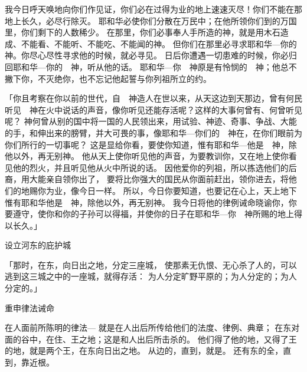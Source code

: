 {我今日呼天唤地向你们作见证，你们必在过{}得为业的地上速速灭尽！你们不能在那地上长久，必尽行除灭。
耶和华必使你们分散在万民中；在他所领你们到的万国里，你们剩下的人数稀少。
在那里，你们必事奉人手所造的神，就是用木石造成、不能看、不能听、不能吃、不能闻的神。
但你们在那里必寻求耶和华—你的　神。你尽心尽性寻求他的时候，就必寻见。
日后你遭遇一切患难的时候，你必归回耶和华—你的　神，听从他的话。
耶和华—你　神原是有怜悯的　神；他总不撇下你，不灭绝你，也不忘记他起誓与你列祖所立的约。
\par }{\PP {}「你且考察在你以前的世代，自　神造人在世以来，从天这边到天那边，曾有何民听见　神在火中说话的声音，像你听见还能存活呢？这样的大事何曾有、何曾听见呢？
神何曾从别的国中将一国的人民领出来，用试验、神迹、奇事、争战、大能的手，和伸出来的膀臂，并大可畏的事，像耶和华—你们的　神在{}，在你们眼前为你们所行的一切事呢？
这是显给你看，要使你知道，惟有耶和华—他是　神，除他以外，再无别神。
他从天上使你听见他的声音，为要教训你，又在地上使你看见他的烈火，并且听见他从火中所说的话。
因他爱你的列祖，所以拣选他们的后裔，用大能亲自领你出了{}，
要将比你强大的国民从你面前赶出，领你进去，将他们的地赐你为业，像今日一样。
所以，今日你要知道，也要记在心上，天上地下惟有耶和华他是　神，除他以外，再无别神。
我今日将他的律例诫命晓谕你，你要遵守，使你和你的子孙可以得福，并使你的日子在耶和华—你　神所赐的地上得以长久。」
\par }{\SH 设立河东的庇护城
\par }{\PP {}「那时，{}在{}东，向日出之地，分定三座城，
使那素无仇恨、无心杀了人的，可以逃到这三城之中的一座城，就得存活：
为{}人分定旷野平原的{}；为{}人分定{}的{}；为{}人分定{}的{}。」
\par }{\SH 重申律法诫命
\par }{\PP {}在{}人面前所陈明的律法—
就是{}在{}人出{}后所传给他们的法度、律例、典章；
在{}东{}对面的谷中，在住{}、{}王{}之地；这{}是{}和{}人出{}后所击杀的。
他们得了他的地，又得了{}王{}的地，就是两个{}王，在{}东向日出之地。
从{}边的{}，直到{}，就是{}。
还有{}东的全{}，直到{}，靠近{}根。

}
